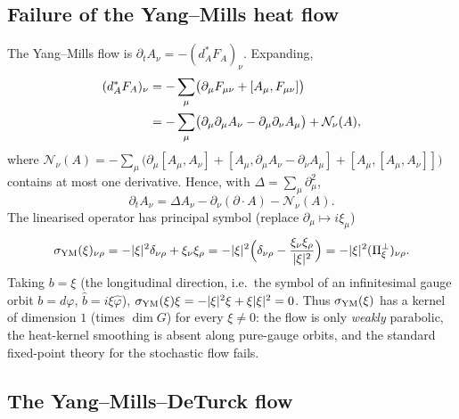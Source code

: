 \documentclass[11pt,a4paper]{article}
\theoremstyle{definition}
\theoremstyle{remark}
\begin{document}
\subsection{Failure of the Yang--Mills heat flow}

The Yang--Mills flow is $\partial_tA_\nu=-(d_A^*F_A)_\nu$. Expanding,
\begin{align}
(d_A^*F_A)_\nu&=-\sum_\mu\bigl(\partial_\mu F_{\mu\nu}+[A_\mu,F_{\mu\nu}]\bigr)\notag\\
&=-\sum_\mu\bigl(\partial_\mu\partial_\mu A_\nu-\partial_\mu\partial_\nu A_\mu\bigr)+\mathcal N_\nu(A),
\end{align}
where $\mathcal N_\nu(A)=-\sum_\mu\bigl(\partial_\mu[A_\mu,A_\nu]+[A_\mu,\partial_\mu A_\nu-\partial_\nu A_\mu]+[A_\mu,[A_\mu,A_\nu]]\bigr)$ contains at most one derivative. Hence, with $\Delta=\sum_\mu\partial_\mu^2$,
\begin{equation}
\partial_tA_\nu=\Delta A_\nu-\partial_\nu(\partial\!\cdot\! A)-\mathcal N_\nu(A).
\end{equation}
The linearised operator has principal symbol (replace $\partial_\mu\mapsto i\xi_\mu$)
\begin{equation}\label{eq:symbolYM}
\sigma_{\rm YM}(\xi)_{\nu\rho}=-|\xi|^2\delta_{\nu\rho}+\xi_\nu\xi_\rho=-|\xi|^2\Bigl(\delta_{\nu\rho}-\frac{\xi_\nu\xi_\rho}{|\xi|^2}\Bigr)=-|\xi|^2(\Pi^{\perp}_\xi)_{\nu\rho}.
\end{equation}
Taking $b=\xi$ (the longitudinal direction, i.e.\ the symbol of an infinitesimal gauge orbit $b=d\varphi$, $\hat b=i\xi\hat\varphi$), $\sigma_{\rm YM}(\xi)\xi=-|\xi|^2\xi+\xi|\xi|^2=0$. Thus $\sigma_{\rm YM}(\xi)$ has a kernel of dimension $1$ (times $\dim G$) for every $\xi\neq0$: the flow is only \emph{weakly} parabolic, the heat-kernel smoothing is absent along pure-gauge orbits, and the standard fixed-point theory for the stochastic flow fails.

\subsection{The Yang--Mills--DeTurck flow}
\end{document}
